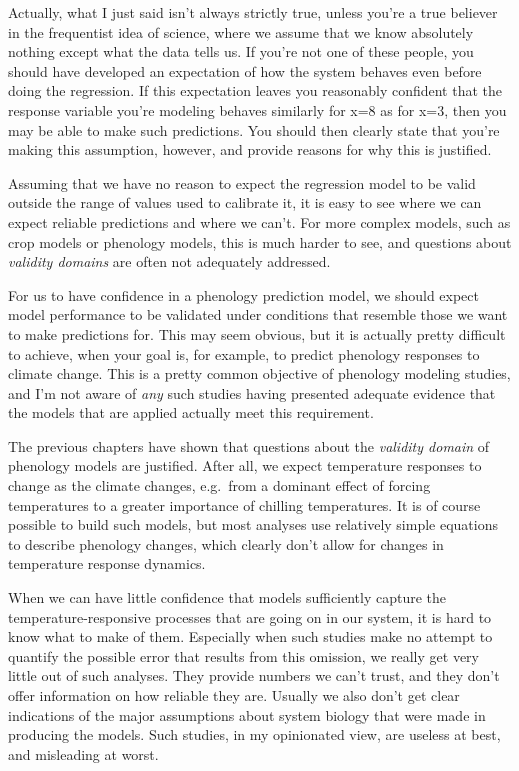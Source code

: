 \documentclass[
]{book}
\begin{document}
Actually, what I just said isn't always strictly true, unless you're a true believer in the frequentist idea of science, where we assume that we know absolutely nothing except what the data tells us. If you're not one of these people, you should have developed an expectation of how the system behaves even before doing the regression. If this expectation leaves you reasonably confident that the response variable you're modeling behaves similarly for x=8 as for x=3, then you may be able to make such predictions. You should then clearly state that you're making this assumption, however, and provide reasons for why this is justified.

Assuming that we have no reason to expect the regression model to be valid outside the range of values used to calibrate it, it is easy to see where we can expect reliable predictions and where we can't. For more complex models, such as crop models or phenology models, this is much harder to see, and questions about \emph{validity domains} are often not adequately addressed.

For us to have confidence in a phenology prediction model, we should expect model performance to be validated under conditions that resemble those we want to make predictions for. This may seem obvious, but it is actually pretty difficult to achieve, when your goal is, for example, to predict phenology responses to climate change. This is a pretty common objective of phenology modeling studies, and I'm not aware of \emph{any} such studies having presented adequate evidence that the models that are applied actually meet this requirement.

The previous chapters have shown that questions about the \emph{validity domain} of phenology models are justified. After all, we expect temperature responses to change as the climate changes, e.g.~from a dominant effect of forcing temperatures to a greater importance of chilling temperatures. It is of course possible to build such models, but most analyses use relatively simple equations to describe phenology changes, which clearly don't allow for changes in temperature response dynamics.

When we can have little confidence that models sufficiently capture the temperature-responsive processes that are going on in our system, it is hard to know what to make of them. Especially when such studies make no attempt to quantify the possible error that results from this omission, we really get very little out of such analyses. They provide numbers we can't trust, and they don't offer information on how reliable they are. Usually we also don't get clear indications of the major assumptions about system biology that were made in producing the models. Such studies, in my opinionated view, are useless at best, and misleading at worst.
\end{document}
